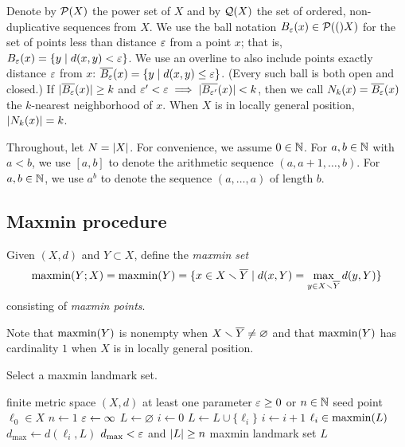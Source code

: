 \documentclass[
]{article}
\begin{document}
Denote by \(\mathcal{P}(X)\) the power set of \(X\) and by \(\mathcal{Q}(X)\) the
set of ordered, non-duplicative sequences from \(X\). We use the ball
notation \(B_{\varepsilon}(x) \in \mathcal{P}(()X)\) for the set of points less than
distance \(\varepsilon\) from a point \(x\); that is,
\(B_{\varepsilon}(x) = \{ y \mid d(x,y) < \varepsilon \}\). We use an overline to also
include points exactly distance \(\varepsilon\) from \(x\):
\(\overline{B_{\varepsilon}}(x) = \{ y \mid d(x,y) \leq \varepsilon \}\). (Every such ball
is both open and closed.) If \(\lvert \overline{B_\varepsilon}(x)\rvert \geq k\) and
\(\varepsilon'<\varepsilon \implies \lvert \overline{B_{\varepsilon'}}(x)\rvert < k\), then we call
\(N_k(x) = \overline{B_\varepsilon}(x)\) the \(k\)-nearest neighborhood of \(x\).
When \(X\) is in locally general position, \(\lvert N_k(x)\rvert = k\).

Throughout, let \(N=\lvert X\rvert\). For convenience, we assume \(0\in\mathbb{N}\).
For \(a,b \in \mathbb{N}\) with \(a<b\), we use \([a,b]\) to denote the
arithmetic sequence \((a,a+1,\ldots,b)\). For \(a,b \in \mathbb{N}\), we use
\(a^b\) to denote the sequence \((a,\ldots,a)\) of length \(b\).

\hypertarget{maxmin-procedure}{%
\subsection{Maxmin procedure}\label{maxmin-procedure}}

\label{sec:maxmin}

\begin{definition}[maxmin]\label{def:maxmin}
Given $(X,d)$ and $Y\subset X$, define the \emph{maxmin set}
$$\operatorname{maxmin}(Y;X) = \operatorname{maxmin}(Y) = \{ x \in X \smallsetminus \overline{Y} \mid d(x,Y) = \max_{y\in X\smallsetminus \overline{Y}}{d(y,Y)} \}$$
consisting of \emph{maxmin points}.
\end{definition}

Note that \(\operatorname{maxmin}(Y)\) is nonempty when
\(X \smallsetminus \overline{Y} \neq \varnothing\) and that \(\operatorname{maxmin}(Y)\) has
cardinality \(1\) when \(X\) is in locally general position.

\begin{algorithm}
\caption{Select a maxmin landmark set.}
\label{alg:maxmin}
\begin{algorithmic}[1]
\REQUIRE finite metric space $(X,d)$
\REQUIRE at least one parameter $\varepsilon\geq 0$ or $n\in\mathbb{N}$
\REQUIRE seed point $\ell_0 \in X$
    \STATE $n \leftarrow 1$
\ENDIF
{}
    \STATE $\varepsilon \leftarrow \infty$
\ENDIF
\STATE $L \leftarrow \varnothing$
\STATE $i \leftarrow 0$
\REPEAT
    \STATE $L \leftarrow L\cup\{\ell_i\}$
    \STATE $i \leftarrow i+1$
    \STATE $\ell_i \in \operatorname{maxmin}(L)$
    \STATE $d_{\operatorname{max}} \leftarrow d(\ell_i,L)$
\UNTIL $d_{\operatorname{max}} < \varepsilon$ and $\lvert L\rvert \geq n$
\RETURN maxmin landmark set $L$
\end{algorithmic}
\end{algorithm}
\end{document}
